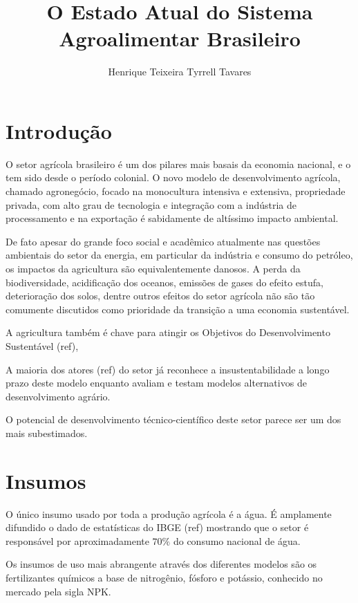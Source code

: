 \documentclass[]{article}
\title{O Estado Atual do Sistema Agroalimentar Brasileiro}
\author{Henrique Teixeira Tyrrell Tavares}
\begin{document}
	
	\maketitle
	
	\begin{abstract}
		
	\end{abstract}
	
	\section{Introdução}
	
	O setor agrícola brasileiro é um dos pilares mais basais da economia nacional, e o tem sido desde o período colonial. O novo modelo de desenvolvimento agrícola, chamado agronegócio, focado na monocultura intensiva e extensiva, propriedade privada, com alto grau de tecnologia  e integração com a indústria de processamento e na exportação é sabidamente de altíssimo impacto ambiental.
	
	De fato apesar do grande foco social e acadêmico atualmente nas questões ambientais do setor da energia, em particular da indústria e consumo do petróleo, os impactos da agricultura são equivalentemente danosos. A perda da biodiversidade, acidificação dos oceanos, emissões de gases do efeito estufa, deterioração dos solos, dentre outros efeitos do setor agrícola não são tão comumente discutidos como prioridade da transição a uma economia sustentável. 
	
	A agricultura também é chave para atingir os Objetivos do Desenvolvimento Sustentável (ref), 
	
	A maioria dos atores (ref) do setor já reconhece a insustentabilidade a longo prazo deste modelo enquanto avaliam e testam modelos alternativos de desenvolvimento agrário. 
	
	O potencial de desenvolvimento técnico-científico deste setor parece ser um dos mais subestimados.
	
	
	
	\section{Insumos}
	
	O único insumo usado por toda a produção agrícola é a água. É amplamente difundido o dado de estatísticas do IBGE (ref) mostrando que o setor é responsável por aproximadamente $70\%$ do consumo nacional de água. 
	
	Os insumos de uso mais abrangente através dos diferentes modelos são os fertilizantes químicos a base de nitrogênio, fósforo e potássio, conhecido no mercado pela sigla NPK. 
	
\end{document}
